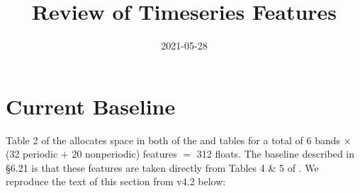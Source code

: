 \documentclass[DM,authoryear,toc]{lsstdoc}
\title{Review of Timeseries Features}
\date{2021-05-28}
\begin{document}
\maketitle


\section{Current Baseline}

Table 2 of the \DPDD{} allocates space in both of the \DIAObject and \Object tables for a total of 6 bands $\times$ (32 periodic $+$ 20 nonperiodic) features $=$ 312 floats.
The baseline described in  \S 6.21 is that these features are taken directly from Tables 4 \& 5 of \citet{2011ApJ...733...10R}.
We reproduce the text of this section from \DPDD v4.2 below:
\end{document}
